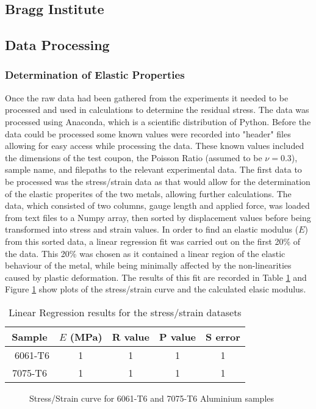 \documentclass[11pt, oneside]{article}   	%
\begin{document}
\subsection{Bragg Institute}
\subsection{Data Processing}
\subsubsection{Determination of Elastic Properties}
Once the raw data had been gathered from the experiments it needed to be processed and used in calculations to determine the residual stress. The data was processed using Anaconda, which is a scientific distribution of Python.
Before the data could be processed some known values were recorded into "header" files allowing for easy access while processing the data. These known values included the dimensions of the test coupon, the Poisson Ratio (assumed to be $\nu = 0.3$), sample name, and filepaths to the relevant experimental data.
The first data to be processed was the stress/strain data as that would allow for the determination of the elastic properites of the two metals, allowing further calculations. The data, which consisted of two columns, gauge length and applied force, was loaded from text files to a Numpy array, then sorted by displacement values before being transformed into stress and strain values.
In order to find an elastic modulus ($E$) from this sorted data, a linear regression fit was carried out on the first 20\% of the data. This 20\% was chosen as it contained a linear region of the elastic behaviour of the metal, while being minimally affected by the non-linearities caused by plastic deformation. The results of this fit are recorded in Table \ref{tab:b} and Figure \ref{fig:StressStrain} show plots of the stress/strain curve and the calculated elasic modulus.
\begin{table}[h]
	\centering
	\caption{Linear Regression results for the stress/strain datasets}\label{tab:b}
	\begin{tabular}[c]{c | c c c c}
	Sample & $E$ (\si{\mega\pascal}) & R value & P value & S error \\ \hline\
	6061-T6 & 1 & 1 & 1 & 1 \\
	7075-T6 & 1 & 1 & 1 & 1 \\
	\end{tabular}
\end{table}
\begin{figure}
	\caption{Stress/Strain curve for 6061-T6 and 7075-T6 Aluminium samples}\label{fig:StressStrain}
\end{figure}
\end{document}
